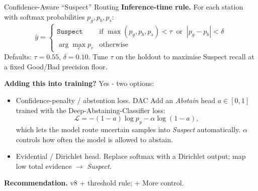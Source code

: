 \documentclass[aspectratio=169]{beamer}
\begin{document}
\begin{frame}{Confidence-Aware ``Suspect'' Routing}
  \textbf{Inference-time rule.} For each station with
  softmax probabilities $p_g, p_b, p_s$:
  \[
    \hat{y} =
    \begin{cases}
      \texttt{Suspect} & \text{if } \max(p_g,p_b,p_s) < \tau
                          \;\;\text{or}\;\; |p_g-p_b| < \delta\\
      \arg\max_c p_c   & \text{otherwise}
    \end{cases}
  \]
  Defaults: $\tau=0.55$, $\delta=0.10$. Tune $\tau$ on the holdout to maximise
  Suspect recall at a fixed Good/Bad precision floor.

  \medskip
  \textbf{Adding this into training?} Yes - two options:
  \begin{itemize}
    \tiny
    \item \alert{Confidence-penalty / abstention loss. DAC} Add an \emph{Abstain}
          head $a\in[0,1]$ trained with the Deep-Abstaining-Classifier loss:
          \[
            \mathcal{L} = -(1-a)\log p_y - \alpha\log(1-a),
          \]
          which lets the model route uncertain samples into \textit{Suspect}
          automatically. $\alpha$ controls how often the model is allowed
          to abstain.
    \item \alert{Evidential / Dirichlet head.} Replace softmax with a Dirichlet
          output; map low total evidence $\rightarrow$ \textit{Suspect}.
  \end{itemize}

  \textbf{Recommendation.} v8 + threshold rule; + More control.
\end{frame}
\end{document}
